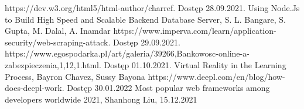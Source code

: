 \documentclass[12pt,twoside]{article}
\begin{document}
\begin{thebibliography}{4}
 https://dev.w3.org/html5/html-author/charref. Dostęp 28.09.2021.
 Using Node.Js to Build High Speed and Scalable Backend Database Server, S. L. Bangare, S. Gupta, M. Dalal, A. Inamdar
 https://www.imperva.com/learn/application-security/web-scraping-attack. Dostęp 29.09.2021.
 https://www.egospodarka.pl/art/galeria/39266,Bankowosc-online-a-zabezpieczenia,1,12,1.html. Dostęp 01.10.2021.
Virtual Reality in the Learning Process, Bayron Chavez, Sussy Bayona
https://www.deepl.com/en/blog/how-does-deepl-work. Dostęp 30.01.2022
 Most popular web frameworks among developers worldwide 2021, Shanhong Liu, 15.12.2021
\end{thebibliography}

\clearpage

\makesummary
\end{document}
